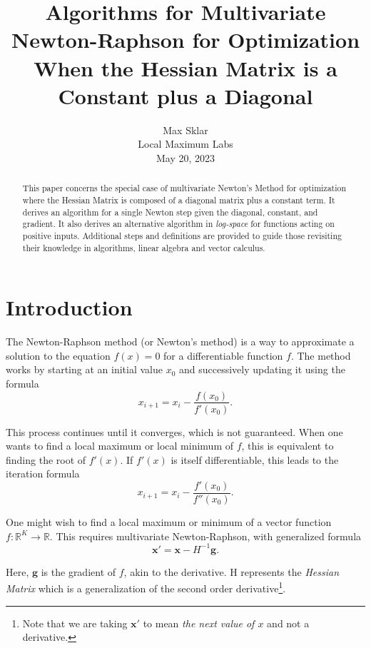 \documentclass[twoside]{article}
\begin{document}
\parindent=0in
\parskip=12pt

\title{
Algorithms for Multivariate Newton-Raphson for Optimization \\
 \large{
    When the Hessian Matrix is a Constant plus a Diagonal
  }
}

\author{Max Sklar\\
Local Maximum Labs\\
May 20, 2023
}

\date{}

\maketitle
\thispagestyle{empty}

\begin{abstract}
This paper concerns the special case of multivariate Newton's Method for optimization where the Hessian Matrix is composed of a diagonal matrix plus a constant term. It derives an algorithm for a single Newton step given the diagonal, constant, and gradient. It also derives an alternative algorithm in \textit{log-space} for functions acting on positive inputs. Additional steps and definitions are provided to guide those revisiting their knowledge in algorithms, linear algebra and vector calculus.
\end{abstract}

\section{Introduction}

The Newton-Raphson method (or Newton's method) is a way to approximate a solution to the equation $f(x) = 0$ for a differentiable function $f$. The method works by starting at an initial value $x_0$ and successively updating it using the formula
\[
x_{i+1} = x_i - \frac{f(x_0)}{f'(x_0)}.
\]

This process continues until it converges, which is not guaranteed. When one wants to find a local maximum or local minimum of $f$, this is equivalent to finding the root of $f'(x)$. If $f'(x)$ is itself differentiable, this leads to the iteration formula
\[
x_{i+1} = x_i - \frac{f'(x_0)}{f''(x_0)}.
\]

One might wish to find a local maximum or minimum of a vector function $f: \mathbb{R}^K \rightarrow \mathbb{R}$. This requires multivariate Newton-Raphson, with generalized formula
\[
\boldsymbol{x}' = \boldsymbol{x} - H^{-1}\boldsymbol{g}.
\]

Here, $\boldsymbol{g}$ is the gradient of $f$, akin to the derivative. H represents the \textit{Hessian Matrix} which is a generalization of the second order derivative\footnote{Note that we are taking $\boldsymbol{x}' $ to mean \textit{the next value of $x$} and not a derivative.}.
\end{document}
